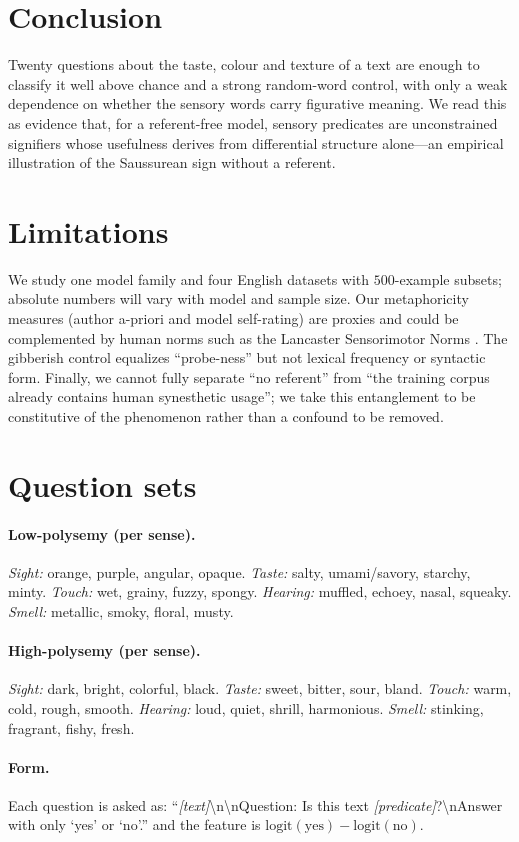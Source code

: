\documentclass[11pt]{article}
\begin{document}
\section{Conclusion}
Twenty questions about the taste, colour and texture of a text are enough to classify it well above chance and a strong random-word control, with only a weak dependence on whether the sensory words carry figurative meaning. We read this as evidence that, for a referent-free model, sensory predicates are unconstrained signifiers whose usefulness derives from differential structure alone---an empirical illustration of the Saussurean sign without a referent.

\section*{Limitations}
We study one model family and four English datasets with $500$-example subsets; absolute numbers will vary with model and sample size. Our metaphoricity measures (author a-priori and model self-rating) are proxies and could be complemented by human norms such as the Lancaster Sensorimotor Norms \citep{lynott2020lancaster}. The gibberish control equalizes ``probe-ness'' but not lexical frequency or syntactic form. Finally, we cannot fully separate ``no referent'' from ``the training corpus already contains human synesthetic usage''; we take this entanglement to be constitutive of the phenomenon rather than a confound to be removed.



\appendix
\section{Question sets}
\label{sec:appendix}
\paragraph{Low-polysemy (per sense).} \emph{Sight:} orange, purple, angular, opaque. \emph{Taste:} salty, umami/savory, starchy, minty. \emph{Touch:} wet, grainy, fuzzy, spongy. \emph{Hearing:} muffled, echoey, nasal, squeaky. \emph{Smell:} metallic, smoky, floral, musty.
\paragraph{High-polysemy (per sense).} \emph{Sight:} dark, bright, colorful, black. \emph{Taste:} sweet, bitter, sour, bland. \emph{Touch:} warm, cold, rough, smooth. \emph{Hearing:} loud, quiet, shrill, harmonious. \emph{Smell:} stinking, fragrant, fishy, fresh.
\paragraph{Form.} Each question is asked as: ``\textit{[text]}\textbackslash n\textbackslash nQuestion: Is this text \textit{[predicate]}?\textbackslash nAnswer with only `yes' or `no'.'' and the feature is $\mathrm{logit(yes)}-\mathrm{logit(no)}$.
\end{document}
